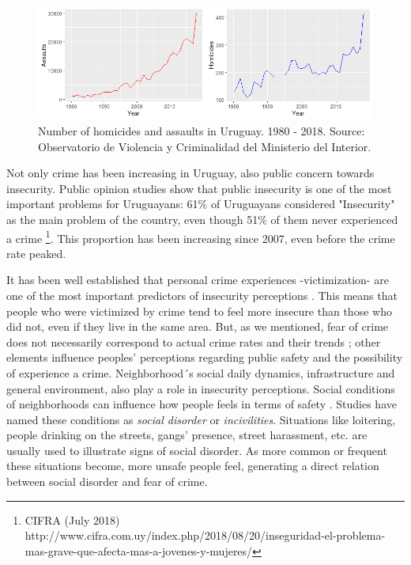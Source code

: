 \documentclass[11pt]{article}
\begin{document}
\begin{figure}[H]
\begin{center}
    \includegraphics{evo_delitos.png}
    \caption{Number of homicides and assaults in Uruguay. 1980 - 2018.  Source: Observatorio de Violencia y Criminalidad del Ministerio del Interior.}
    \label{fig:homrap19802017}
\end{center}
\end{figure}

Not only crime has been increasing in Uruguay, also public concern towards insecurity. Public opinion studies show that public insecurity is one of the most important problems for Uruguayans: 61\% of Uruguayans considered "Insecurity" as the main problem of the country, even though 51\% of them never experienced a crime \footnote{CIFRA (July 2018) http://www.cifra.com.uy/index.php/2018/08/20/inseguridad-el-problema-mas-grave-que-afecta-mas-a-jovenes-y-mujeres/}. This proportion has been increasing since 2007, even before the crime rate peaked.

It has been well established that personal crime experiences -victimization- are one of the most important predictors of insecurity perceptions \citep{cruz2009public}. This means that people who were victimized by crime tend to feel more insecure than those who did not, even if they live in the same area. But, as we mentioned, fear of crime does not necessarily correspond to actual crime rates and their trends \citep{wong2012bringing}; other elements influence peoples' perceptions regarding public safety and the possibility of experience a crime. Neighborhood´s social daily dynamics, infrastructure and general environment, also play a role in insecurity perceptions. Social conditions of neighborhoods can influence how people feels in terms of safety \citep{cruz2009public, brunton2011neighborhoods, valera2014perceived}. Studies have named these conditions as \textit{social disorder} or \textit{incivilities}. Situations like loitering, people drinking on the streets, gangs' presence, street harassment, etc. \citep{bennett1994determinants, valera2014perceived} are usually used to illustrate signs of social disorder. As more common or frequent these situations become, more unsafe people feel, generating a direct relation between social disorder and fear of crime.
\end{document}
